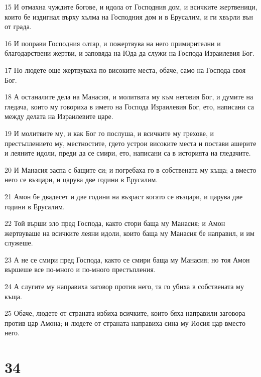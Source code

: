 \par 15 И отмахна чуждите богове, и идола от Господния дом, и всичките жертвеници, които бе издигнал върху хълма на Господния дом и в Ерусалим, и ги хвърли вън от града.
\par 16 И поправи Господния олтар, и пожертвува на него примирителни и благодарствени жертви, и заповяда на Юда да служи на Господа Израилевия Бог.
\par 17 Но людете още жертвуваха по високите места, обаче, само на Господа своя Бог.
\par 18 А останалите дела на Манасия, и молитвата му към неговия Бог, и думите на гледача, които му говориха в името на Господа Израилевия Бог, ето, написани са между делата на Израилевите царе.
\par 19 И молитвите му, и как Бог го послуша, и всичките му грехове, и престъплението му, местностите, гдето устрои високите места и постави ашерите и леяните идоли, преди да се смири, ето, написани са в историята на гледачите.
\par 20 И Манасия заспа с бащите си; и погребаха го в собствената му къща; а вместо него се възцари, и царува две години в Ерусалим.
\par 21 Амон бе двадесет и две години на възраст когато се възцари, и царува две години в Ерусалим.
\par 22 Той върши зло пред Господа, както стори баща му Манасия; и Амон жертвуваше на всичките леяни идоли, които баща му Манасия бе направил, и им служеше.
\par 23 А не се смири пред Господа, както се смири баща му Манасия; но тоя Амон вършеше все по-много и по-много престъпления.
\par 24 А слугите му направиха заговор против него, та го убиха в собствената му къща.
\par 25 Обаче, людете от страната избиха всичките, които бяха направили заговора против цар Амона; и людете от страната направиха сина му Иосия цар вместо него.

\chapter{34}

